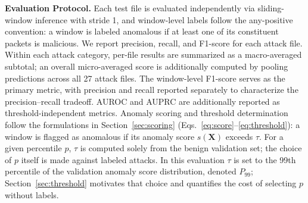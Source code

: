 \noindent\textbf{Evaluation Protocol.}
Each test file is evaluated independently via sliding-window inference with stride 1, and window-level labels follow the any-positive convention: a window is labeled anomalous if at least one of its constituent packets is malicious. We report precision, recall, and F1-score for each attack file. Within each attack category, per-file results are summarized as a macro-averaged subtotal; an overall micro-averaged score is additionally computed by pooling predictions across all 27 attack files. The window-level F1-score serves as the primary metric, with precision and recall reported separately to characterize the precision--recall tradeoff. AUROC and AUPRC are additionally reported as threshold-independent metrics. Anomaly scoring and threshold determination follow the formulations in Section~\ref{sec:scoring} (Eqs.~\eqref{eq:score}--\eqref{eq:threshold}): a window is flagged as anomalous if its anomaly score $s(\mathbf{X})$ exceeds $\tau$. For a given percentile $p$, $\tau$ is computed solely from the benign validation set; the choice of $p$ itself is made against labeled attacks. In this evaluation $\tau$ is set to the 99th percentile of the validation anomaly score distribution, denoted $P_{99}$; Section~\ref{sec:threshold} motivates that choice and quantifies the cost of selecting $p$ without labels.

